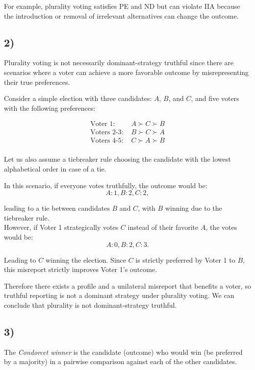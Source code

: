 \documentclass[10pt]{article}
\begin{document}
For example, plurality voting satisfies PE and ND but can violate IIA
because the introduction or removal of irrelevant alternatives can
change the outcome.

\subsection*{2)}

Plurality voting is not necessarily dominant-strategy truthful since
there are scenarios where a voter can achieve a more favorable
outcome by misrepresenting their true preferences.

Consider a simple election with three candidates: $A$, $B$, and $C$,
and five voters with the following preferences:

\begin{align*}
\text{Voter 1: } & A \succ C \succ B \\
\text{Voters 2-3: } & B \succ C \succ A \\%
\text{Voters 4-5: } & C \succ A \succ B \\%
\end{align*}

Let us also assume a tiebreaker rule choosing the candidate with the
lowest alphabetical order in case of a tie.

In this scenario, if everyone votes truthfully, the outcome
would be:
\[A: 1, B: 2, C: 2,\]

leading to a tie between candidates $B$ and $C$, with $B$ winning due
to the tiebreaker rule.\\

However, if Voter 1 strategically votes $C$ instead of their favorite
$A$, the votes would be:
\[A: 0, B: 2, C: 3.\]

Leading to $C$ winning the election. Since $C$ is strictly preferred
by Voter 1 to $B$, this misreport strictly improves Voter 1's outcome.

Therefore there exists a profile and a unilateral misreport that
benefits a voter, so truthful reporting is not a dominant strategy
under plurality voting. We can conclude that plurality is not
dominant-strategy truthful.

\subsection*{3)}

The \textit{Condorcet winner} is the candidate (outcome) who would
win (be preferred by a majority) in a pairwise comparison against
each of the other candidates.
\end{document}
